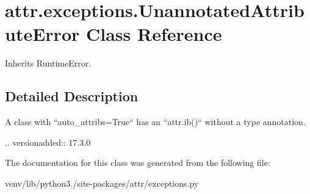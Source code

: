 \hypertarget{classattr_1_1exceptions_1_1_unannotated_attribute_error}{}\section{attr.\+exceptions.\+Unannotated\+Attribute\+Error Class Reference}
\label{classattr_1_1exceptions_1_1_unannotated_attribute_error}


Inherits Runtime\+Error.



\subsection{Detailed Description}
\begin{DoxyVerb}A class with ``auto_attribs=True`` has an ``attr.ib()`` without a type
annotation.

.. versionadded:: 17.3.0
\end{DoxyVerb}
 

The documentation for this class was generated from the following file\+:\begin{DoxyCompactItemize}
\item 
venv/lib/python3./site-\/packages/attr/exceptions.\+py\end{DoxyCompactItemize}
